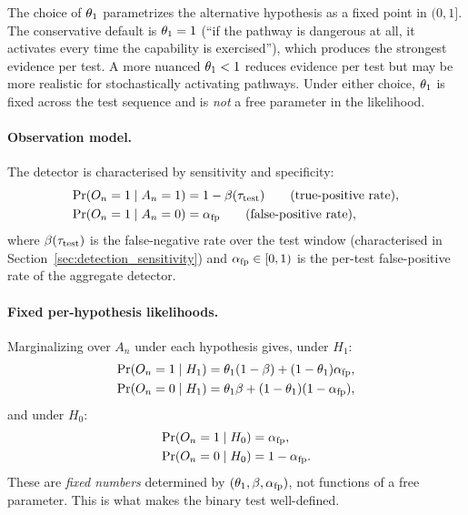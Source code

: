 The choice of $\theta_1$ parametrizes the alternative hypothesis
as a fixed point in $(0, 1]$.  The conservative default is
$\theta_1 = 1$ (``if the pathway is dangerous at all, it
activates every time the capability is exercised''), which
produces the strongest evidence per test.  A more nuanced
$\theta_1 < 1$ reduces evidence per test but may be more
realistic for stochastically activating pathways.  Under either
choice, $\theta_1$ is fixed across the test sequence and is
\emph{not} a free parameter in the likelihood.

\paragraph{Observation model.}
The detector is characterised by sensitivity and specificity:
\begin{align*}
\Pr(O_n = 1 \mid A_n = 1) &= 1 - \beta(\tau_{\mathrm{test}})
  \qquad (\text{true-positive rate}),\\
\Pr(O_n = 1 \mid A_n = 0) &= \alpha_{\mathrm{fp}}
  \qquad (\text{false-positive rate}),
\end{align*}
where $\beta(\tau_{\mathrm{test}})$ is the false-negative rate over the test
window (characterised in Section~\ref{sec:detection_sensitivity})
and $\alpha_{\mathrm{fp}} \in [0, 1)$ is the per-test false-positive rate of
the aggregate detector.

\paragraph{Fixed per-hypothesis likelihoods.}
Marginalizing over $A_n$ under each hypothesis gives, under $H_1$:
\begin{align}
\label{eq:lik_h1}
\Pr(O_n = 1 \mid H_1)
  &= \theta_1 (1 - \beta) + (1 - \theta_1) \alpha_{\mathrm{fp}}, \\
\Pr(O_n = 0 \mid H_1)
  &= \theta_1 \beta + (1 - \theta_1) (1 - \alpha_{\mathrm{fp}}),
\nonumber
\end{align}
and under $H_0$:
\begin{align}
\label{eq:lik_h0}
\Pr(O_n = 1 \mid H_0) &= \alpha_{\mathrm{fp}},\\
\Pr(O_n = 0 \mid H_0) &= 1 - \alpha_{\mathrm{fp}}.
\nonumber
\end{align}
These are \emph{fixed numbers} determined by $(\theta_1, \beta,
\alpha_{\mathrm{fp}})$, not functions of a free parameter.  This is what makes
the binary test well-defined.

